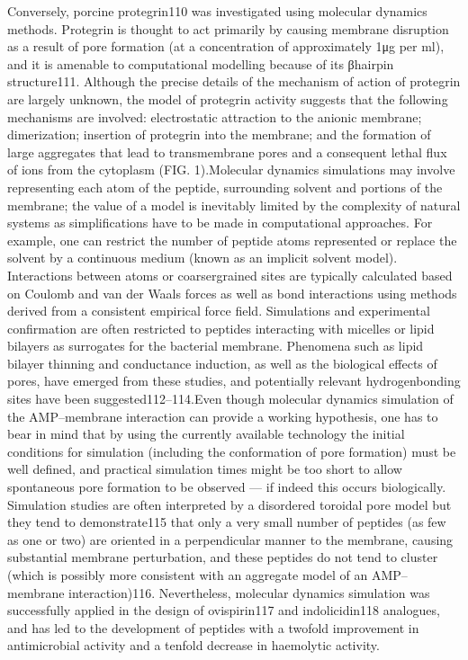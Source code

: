\documentclass[a4paper,11pt]{extreport}
\begin{document}
Conversely, porcine protegrin110 was investigated using molecular dynamics methods. Protegrin is thought to act primarily by causing membrane disruption as a result of pore formation (at a concentration of approxi­mately 1μg per ml), and it is amenable to computational modelling because of its β­hairpin structure111. Although the precise details of the mechanism of action of proteg­rin are largely unknown, the model of protegrin activity suggests that the following mechanisms are involved: electrostatic attraction to the anionic membrane; dimeri­zation; insertion of protegrin into the membrane; and the formation of large aggregates that lead to transmem­brane pores and a consequent lethal flux of ions from the cytoplasm (FIG. 1).Molecular dynamics simulations may involve repre­senting each atom of the peptide, surrounding solvent and portions of the membrane; the value of a model is inevitably limited by the complexity of natural systems as simplifications have to be made in computational approaches. For example, one can restrict the number of peptide atoms represented or replace the solvent by a continuous medium (known as an implicit sol­vent model). Interactions between atoms or coarser­grained sites are typically calculated based on Coulomb and van der Waals forces as well as bond interactions using methods derived from a consistent empirical force field. Simulations and experimental confirma­tion are often restricted to peptides interacting with micelles or lipid bilayers as surrogates for the bacterial membrane. Phenomena such as lipid bilayer thinning and conductance induction, as well as the biological effects of pores, have emerged from these studies, and potentially relevant hydrogen­bonding sites have been suggested112–114.Even though molecular dynamics simulation of the AMP–membrane interaction can provide a working hypothesis, one has to bear in mind that by using the currently available technology the initial conditions for simulation (including the conformation of pore forma­tion) must be well defined, and practical simulation times might be too short to allow spontaneous pore forma­tion to be observed — if indeed this occurs biologically. Simulation studies are often interpreted by a disordered toroidal pore model but they tend to demonstrate115 that only a very small number of peptides (as few as one or two) are oriented in a perpendicular manner to the membrane, causing substantial membrane perturba­tion, and these peptides do not tend to cluster (which is possibly more consistent with an aggregate model of an AMP–membrane interaction)116. Nevertheless, molecu­lar dynamics simulation was successfully applied in the design of ovispirin117 and indolicidin118 analogues, and has led to the development of peptides with a twofold improvement in antimicrobial activity and a tenfold decrease in haemolytic activity.
\end{document}
